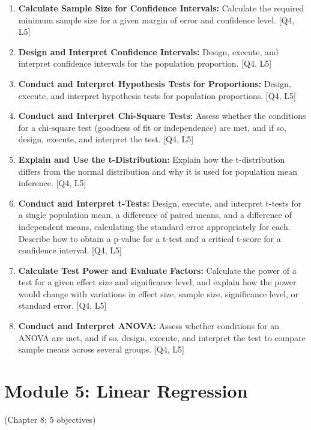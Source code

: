 \documentclass[12pt]{article}
\begin{document}
\begin{enumerate}
    \item \textbf{Calculate Sample Size for Confidence Intervals:} Calculate the required minimum sample size for a given margin of error and confidence level. [Q4, L5]
    \item \textbf{Design and Interpret Confidence Intervals:} Design, execute, and interpret confidence intervals for the population proportion. [Q4, L5]
    \item \textbf{Conduct and Interpret Hypothesis Tests for Proportions:} Design, execute, and interpret hypothesis tests for population proportions. [Q4, L5]
    \item \textbf{Conduct and Interpret Chi-Square Tests:} Assess whether the conditions for a chi-square test (goodness of fit or independence) are met, and if so, design, execute, and interpret the test. [Q4, L5]
    \item \textbf{Explain and Use the t-Distribution:} Explain how the t-distribution differs from the normal distribution and why it is used for population mean inference. [Q4, L5]
    \item \textbf{Conduct and Interpret t-Tests:} Design, execute, and interpret t-tests for a single population mean, a difference of paired means, and a difference of independent means, calculating the standard error appropriately for each. Describe how to obtain a p-value for a t-test and a critical t-score for a confidence interval. [Q4, L5]
    \item \textbf{Calculate Test Power and Evaluate Factors:} Calculate the power of a test for a given effect size and significance level, and explain how the power would change with variations in effect size, sample size, significance level, or standard error. [Q4, L5]
    \item \textbf{Conduct and Interpret ANOVA:} Assess whether conditions for an ANOVA are met, and if so, design, execute, and interpret the test to compare sample means across several groups. [Q4, L5] 
\end{enumerate}

\newpage


\section{Module 5: Linear Regression}
(Chapter 8; 5 objectives)

\end{document}
